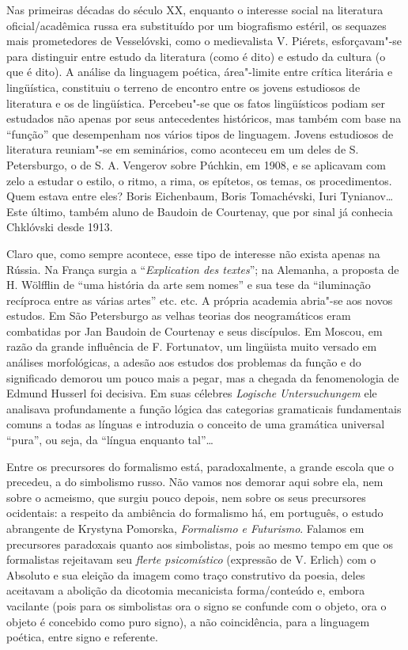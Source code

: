 Nas primeiras décadas do século XX, enquanto o interesse social na
literatura oficial/acadêmica russa era substituído por um biografismo
estéril, os sequazes mais prometedores de Vesselóvski, como o
medievalista V. Piérets, esforçavam"-se para distinguir entre estudo da
literatura (como é dito) e estudo da cultura (o que é dito). A análise
da linguagem poética, área"-limite entre crítica literária e lingüística,
constituiu o terreno de encontro entre os jovens estudiosos de
literatura e os de lingüística. Percebeu"-se que os fatos lingüísticos
podiam ser estudados não apenas por seus antecedentes históricos, mas
também com base na ``função'' que desempenham nos vários tipos de
linguagem. Jovens estudiosos de literatura reuniam"-se em seminários,
como aconteceu em um deles de S. Petersburgo, o de S. A. Vengerov sobre
Púchkin, em 1908, e se aplicavam com zelo a estudar o estilo, o ritmo, a
rima, os epítetos, os temas, os procedimentos. Quem estava entre eles?
Boris Eichenbaum, Boris Tomachévski, Iuri Tynianov\ldots{} Este último,
também aluno de Baudoin de Courtenay, que por sinal já conhecia
Chklóvski desde 1913.

Claro que, como sempre acontece, esse tipo de interesse não exista
apenas na Rússia. Na França surgia a ``\emph{Explication des textes}'';
na Alemanha, a proposta de H. Wölfflin de ``uma história da arte sem
nomes'' e sua tese da ``iluminação recíproca entre as várias artes''
etc. etc. A própria academia abria"-se aos novos estudos. Em São
Petersburgo as velhas teorias dos neogramáticos eram combatidas por Jan
Baudoin de Courtenay e seus discípulos. Em Moscou, em razão da grande
influência de F. Fortunatov, um lingüista muito versado em análises
morfológicas, a adesão aos estudos dos problemas da função e do
significado demorou um pouco mais a pegar, mas a chegada da
fenomenologia de Edmund Husserl foi decisiva. Em suas célebres
\emph{Logische} \emph{Untersuchungem} ele analisava profundamente a
função lógica das categorias gramaticais fundamentais comuns a todas as
línguas e introduzia o conceito de uma gramática universal ``pura'', ou
seja, da ``língua enquanto tal''\ldots{}

Entre os precursores do formalismo está, paradoxalmente, a grande escola
que o precedeu, a do simbolismo russo. Não vamos nos demorar aqui sobre
ela, nem sobre o acmeismo, que surgiu pouco depois, nem sobre os seus
precursores ocidentais: a respeito da ambiência do formalismo há, em
português, o estudo abrangente de Krystyna Pomorska, \emph{Formalismo e
Futurismo}. Falamos em precursores paradoxais quanto aos simbolistas,
pois ao mesmo tempo em que os formalistas rejeitavam seu \emph{flerte
psicomístico} (expressão de V. Erlich) com o Absoluto e sua eleição da
imagem como traço construtivo da poesia, deles aceitavam a abolição da
dicotomia mecanicista forma/conteúdo e, embora vacilante (pois para os
simbolistas ora o signo se confunde com o objeto, ora o objeto é
concebido como puro signo), a não coincidência, para a linguagem
poética, entre signo e referente.

